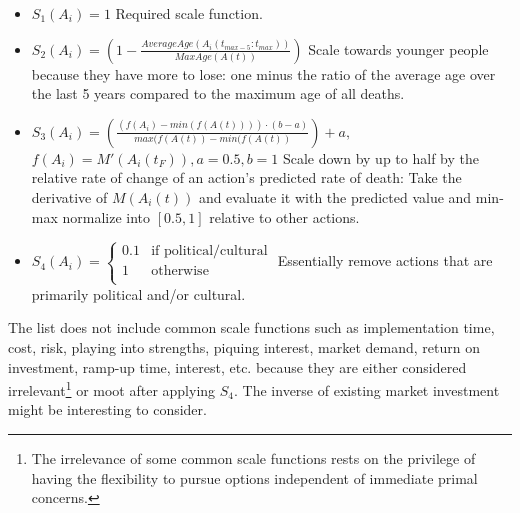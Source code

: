 \documentclass[10pt, a4paper, twocolumn]{IEEEconf}
\begin{document}
\begin{itemize}
  \item $S_1(A_i) = 1$
                  \newline\newline
                  Required scale function.
  \item $S_2(A_i) = \left(1 - \frac{AverageAge(A_i(t_{max-5}:t_{max}))}{MaxAge(A(t))}\right)$
                  \newline\newline
                  Scale towards younger people because they have more to lose: one minus the ratio of the average age\cite{nbermortality} over the last 5 years compared to the maximum age of all deaths.
  \item $S_3(A_i) = \left(\frac{(f(A_i)-min(f(A(t)))) \cdot (b-a)}{max(f(A(t))-min(f(A(t))}\right) + a,$
                  \newline\newline
                  $f(A_i) = M'(A_i(t_F)), a=0.5, b=1$
                  \newline\newline
                  Scale down by up to half by the relative rate of change of an action's predicted rate of death: Take the derivative of $M(A_i(t))$ and evaluate it with the predicted value and min-max normalize into $[0.5,1]$ relative to other actions.
  \item $S_4(A_i) = \begin{cases}\text{0.1} & \mbox{if political/cultural} \\ \text{1} & \mbox{otherwise} \\ \end{cases}$
                  \newline\newline
                  Essentially remove actions that are primarily political and/or cultural\cite{huemer2012praise}.
\end{itemize}

The list does not include common scale functions such as implementation time, cost, risk, playing into strengths, piquing interest, market demand, return on investment, ramp-up time, interest, etc. because they are either considered irrelevant\footnote{The irrelevance of some common scale functions rests on the privilege of having the flexibility to pursue options independent of immediate primal concerns.} or moot after applying $S_4$.
The inverse of existing market investment might be interesting to consider.
\end{document}
